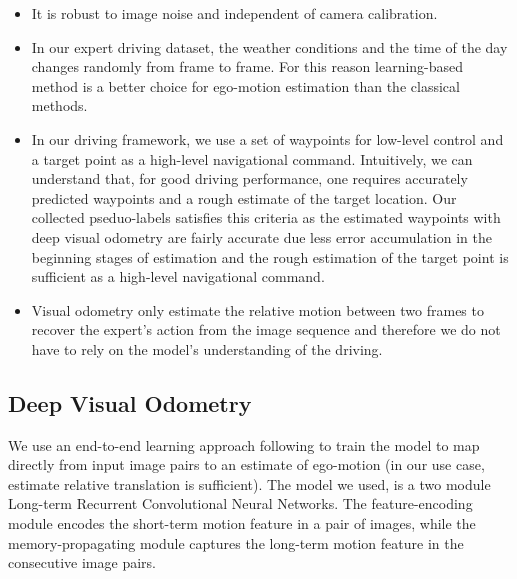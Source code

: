 \documentclass[12pt, letterpaper,cleardoubleempty,BCOR1cm]{scrbook}
\begin{document}
\begin{itemize}
\item It is robust to image noise and independent of camera calibration.
\item In our expert driving dataset, the weather conditions and the time of the day
changes randomly from frame to frame. For this reason learning-based method is
a better choice for ego-motion estimation than the classical methods.
\item In our driving framework, we use a set of waypoints for low-level control and
a target point as a high-level navigational command. Intuitively, we can
understand that, for good driving performance, one requires accurately
predicted waypoints and a rough estimate of the target location. Our collected
pseduo-labels satisfies this criteria as the estimated waypoints with deep
visual odometry are fairly accurate due less error accumulation in the
beginning stages of estimation and the rough estimation of the target point is
sufficient as a high-level navigational command.
\item Visual odometry only estimate the relative motion between two frames to
recover the expert's action from the image sequence and therefore we do not
have to rely on the model's understanding of the driving.
\end{itemize}

\subsection{Deep Visual Odometry}
\label{sec:orga952f66}
We use an end-to-end learning approach following \cite{Wang2017, Zhai2019} to
train the model to map directly from input image pairs to an estimate of
ego-motion (in our use case, estimate relative translation is sufficient). The
model we used, is a two module Long-term Recurrent Convolutional Neural
Networks. The feature-encoding module encodes the short-term motion feature in a
pair of images, while the memory-propagating module captures the long-term
motion feature in the consecutive image pairs.
\end{document}
